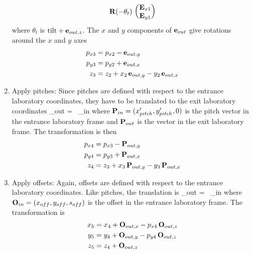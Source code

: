 \begin{enumerate}
\begin{align}
    {{\bf R}} (-\theta_{t}) \,   \begin{pmatrix} {{\bf E}}_{x1} \\ {{\bf E}}_{y1} \end{pmatrix} \nonumber
\end{align}
where $\theta_t$ is $\mbox{tilt} + {\bf e}_{out,z}$. The $x$ and $y$ components
of ${\bf e}_{out}$ give rotations around the $x$ and $y$ axes
\begin{align}
  p_{x3} &= p_{x2} - {\bf e}_{out,y} \nonumber \\
  p_{y3} &= p_{y2} + {\bf e}_{out,x} \\
  z_3    &= z_2 + x_2 \, {\bf e}_{out,y} - y_2 \, {\bf e}_{out,x}
\end{align}
  \item
Apply pitches: Since pitches are defined with
respect to the entrance laboratory coordinates, they have to be
translated to the exit laboratory coordinates
\Begineq
  \bP_{out} = \bS \, \bP_{in}
\Endeq
where ${{\bf P}}_{in} = (x'_{pitch}, y'_{pitch}, 0)$ is the pitch vector in
the entrance laboratory frame and ${{\bf P}}_{out}$ is the vector in the exit
laboratory frame. The transformation is then
\begin{align}
  p_{x4} &= p_{x3} - {{\bf P}}_{out,y} \nonumber \\
  p_{y4} &= p_{y3} + {{\bf P}}_{out,x} \\
  z_4    &= z_3 + x_3 \, {{\bf P}}_{out,y} - y_3 \, {{\bf P}}_{out,x}
\end{align}
  \item
Apply offsets: Again, offsets are defined with respect to the
entrance laboratory coordinates. Like pitches, the translation is
\Begineq
  \bO_{out} = \bS \, \bO_{in}
\Endeq
where ${{\bf O}}_{in} = (x_{off}, y_{off}, s_{off})$ is the offset in the
entrance laboratory frame. The transformation is
\begin{align}
  x_5 &= x_4 + {{\bf O}}_{out,x} - p_{x4} \, {{\bf O}}_{out,z} \nonumber \\
  y_5 &= y_4 + {{\bf O}}_{out,y} - p_{y4} \, {{\bf O}}_{out,z} \\
  z_5 &= z_4 + {{\bf O}}_{out,z} 
\end{align}
  \end{enumerate}


